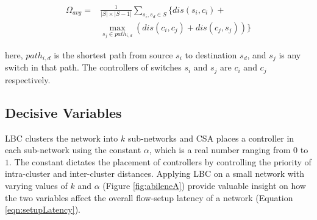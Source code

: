\documentclass[journal]{IEEEtran}
\begin{document}
\begin{equation} \label{eqn:setupLatency}
\begin{split}
\Omega_{avg} = &\frac{1}{|S|\times |S-1|}\sum_{s_i,s_d\in S} \{dis(s_i,c_i)+\\&\max_{s_j\in path_{i,d}}\left(dis(c_i,c_j)+dis(c_j,s_j) \right) \}
\end{split}
\end{equation}

here, $path_{i,d}$ is the shortest path from source $s_i$ to destination $s_d$, and $s_j$ is any switch in that path. The controllers of switches $s_i$ and $s_j$ are $c_i$ and $c_j$ respectively.



\subsection{Decisive Variables} \label{optimumK}
LBC clusters the network into $k$ sub-networks and CSA places a controller in each sub-network using the constant $\alpha$, which is a real number ranging from $0$ to $1$. The constant dictates the placement of controllers by controlling the priority of intra-cluster and inter-cluster distances. Applying LBC on a small network with varying values of $k$ and $\alpha$ (Figure \ref{fig:abileneA}) provide valuable insight on how the two variables affect the overall flow-setup latency of a network (Equation \ref{eqn:setupLatency}).
\end{document}
